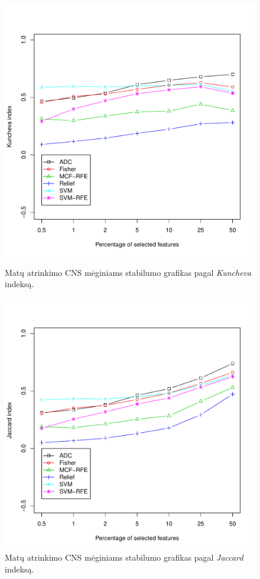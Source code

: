 \begin{figure}[!htb]
\begin{minipage}[b]{0.5\linewidth}
\centering
\includegraphics[width=\textwidth]{../bachelor/images/nncns_robustness_kuncheva.pdf}
\caption{Matų atrinkimo CNS mėginiams stabilumo grafikas pagal \textit{Kuncheva} indeksą.}
\label{fig:robk_cns}
\end{minipage}
\hspace{0.1cm}
\begin{minipage}[b]{0.5\linewidth}
\centering
\includegraphics[width=\textwidth]{../bachelor/images/nncns_robustness_jaccard.pdf}
\caption{Matų atrinkimo CNS mėginiams stabilumo grafikas pagal \textit{Jaccard} indeksą.}
\label{fig:robj_cns}
\end{minipage}
\end{figure}

